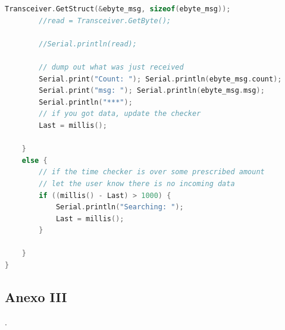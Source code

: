 \documentclass[12pt]{article}
\begin{document}
\begin{lstlisting}[language=C]
		Transceiver.GetStruct(&ebyte_msg, sizeof(ebyte_msg));
		//read = Transceiver.GetByte();
		
		//Serial.println(read);
		
		// dump out what was just received
		Serial.print("Count: "); Serial.println(ebyte_msg.count);
		Serial.print("msg: "); Serial.println(ebyte_msg.msg);
		Serial.println("***");
		// if you got data, update the checker
		Last = millis();
		
	}
	else {
		// if the time checker is over some prescribed amount
		// let the user know there is no incoming data
		if ((millis() - Last) > 1000) {
			Serial.println("Searching: ");
			Last = millis();
		}
		
	}
}
	\end{lstlisting}

	\pagebreak
	
	\subsection*{Anexo III}
	\label{subsection: presupuesto}
	
	. \\
	
	\pagebreak
	
\end{document}
